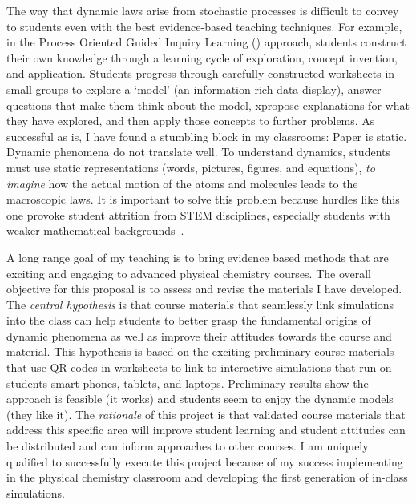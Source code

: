 \documentclass[10pt,letterpaper]{article}
\begin{document}


The way that dynamic laws arise from stochastic processes is difficult to convey to students even with the best evidence-based teaching techniques. For example, in the Process Oriented Guided Inquiry Learning (\pogil) approach, students construct their own knowledge
through a learning cycle of exploration, concept invention, and application.
Students progress through carefully constructed worksheets in small groups to explore a `model' (an information rich data display), answer questions that make them think about the model, xpropose explanations for what they have explored, and then apply those concepts to further problems. 
As successful as \pogil is, I have found a stumbling block in my classrooms: Paper is static. Dynamic phenomena do not translate well. To understand dynamics, students must use static representations (words, pictures, figures, and equations), \textit{to imagine} how the actual motion of the atoms and molecules leads to the macroscopic laws.
It is important to solve this problem because hurdles like this one provoke student attrition from STEM disciplines, especially students with weaker mathematical backgrounds~\cite{Seymour1997}.

A long range goal of my teaching is to bring evidence based methods that are exciting and engaging to advanced physical chemistry courses. The overall objective for this proposal is to assess and revise the \pogil materials I have developed. The \textit{central hypothesis} is that course materials that seamlessly link simulations into the class can help students to better grasp the fundamental origins of dynamic phenomena as well as improve their attitudes towards the course and material. This hypothesis is based on the exciting preliminary course materials that use QR-codes in \pogil worksheets to link to interactive simulations that run on students smart-phones, tablets, and laptops. Preliminary results show the approach is feasible (\ie it works) and students seem to enjoy the dynamic models (\ie they like it).
%
The \textit{rationale} of this project is that validated course materials that address this specific area will improve student learning and student attitudes can be distributed and can inform approaches to other courses. I am uniquely qualified to successfully execute this project because of my success implementing \pogil in the physical chemistry classroom and developing the first generation of in-class simulations.
\end{document}
